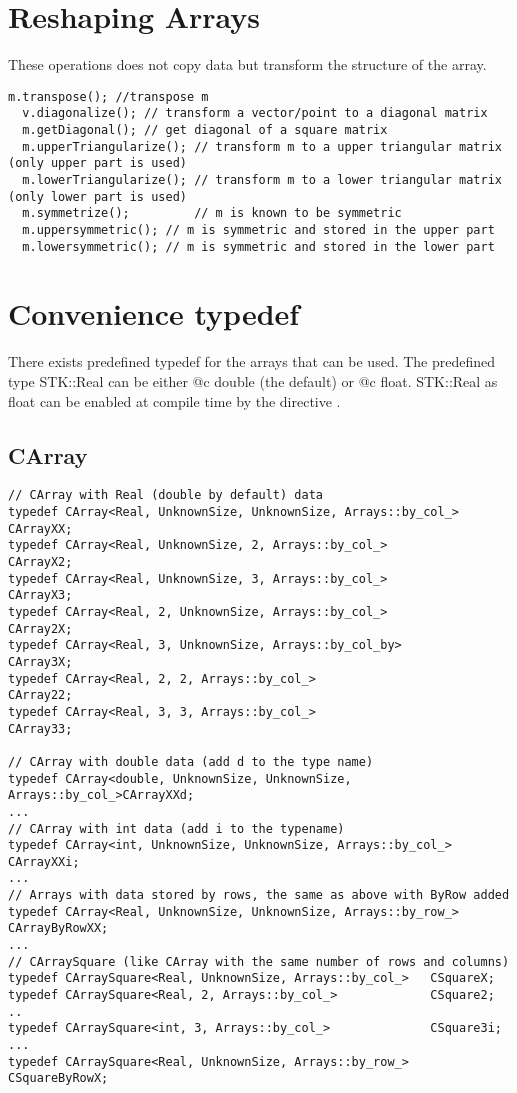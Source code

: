 \documentclass[a4paper,10pt]{article}
\begin{document}
\section{Reshaping Arrays}
These operations does not copy data but transform the structure of the array.

\begin{lstlisting}[style=customcpp,caption=Reshaping operations]
  m.transpose(); //transpose m
  v.diagonalize(); // transform a vector/point to a diagonal matrix
  m.getDiagonal(); // get diagonal of a square matrix
  m.upperTriangularize(); // transform m to a upper triangular matrix (only upper part is used)
  m.lowerTriangularize(); // transform m to a lower triangular matrix (only lower part is used)
  m.symmetrize();         // m is known to be symmetric
  m.uppersymmetric(); // m is symmetric and stored in the upper part
  m.lowersymmetric(); // m is symmetric and stored in the lower part
\end{lstlisting}

\section{Convenience typedef}

There exists predefined typedef for the arrays that can be used.
The predefined type STK::Real can be either @c double (the default) or @c float.
STK::Real as float can be enabled at compile time by the directive
.


\subsection{CArray}
\begin{lstlisting}[style=customcpp,caption=CArray family]
// CArray with Real (double by default) data
typedef CArray<Real, UnknownSize, UnknownSize, Arrays::by_col_> CArrayXX;
typedef CArray<Real, UnknownSize, 2, Arrays::by_col_>           CArrayX2;
typedef CArray<Real, UnknownSize, 3, Arrays::by_col_>           CArrayX3;
typedef CArray<Real, 2, UnknownSize, Arrays::by_col_>           CArray2X;
typedef CArray<Real, 3, UnknownSize, Arrays::by_col_by>         CArray3X;
typedef CArray<Real, 2, 2, Arrays::by_col_>                     CArray22;
typedef CArray<Real, 3, 3, Arrays::by_col_>                     CArray33;

// CArray with double data (add d to the type name)
typedef CArray<double, UnknownSize, UnknownSize, Arrays::by_col_>CArrayXXd;
...
// CArray with int data (add i to the typename)
typedef CArray<int, UnknownSize, UnknownSize, Arrays::by_col_>  CArrayXXi;
...
// Arrays with data stored by rows, the same as above with ByRow added
typedef CArray<Real, UnknownSize, UnknownSize, Arrays::by_row_> CArrayByRowXX;
...
// CArraySquare (like CArray with the same number of rows and columns)
typedef CArraySquare<Real, UnknownSize, Arrays::by_col_>   CSquareX;
typedef CArraySquare<Real, 2, Arrays::by_col_>             CSquare2;
..
typedef CArraySquare<int, 3, Arrays::by_col_>              CSquare3i;
...
typedef CArraySquare<Real, UnknownSize, Arrays::by_row_>   CSquareByRowX;
\end{lstlisting}
\end{document}

